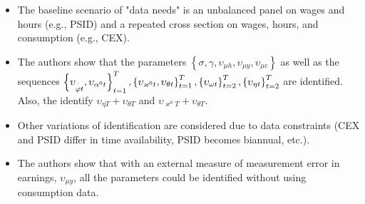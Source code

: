 \documentclass[notes=show]{beamer}
\begin{document}
\bigskip

\begin{frame}%



\begin{itemize}
\item The baseline scenario of "data needs" is an unbalanced panel on wages
and hours (e.g., PSID) and a repeated cross section on wages, hours, and
consumption (e.g., CEX).

\item The authors show that the parameters $\left\{ \sigma ,\gamma ,\upsilon
_{\mu h},\upsilon _{\mu y},\upsilon _{\mu c}\right\} $ as well as the
sequences $\left\{ \upsilon _{\overset{\symbol{94}}{\varphi }t},\upsilon
_{\alpha ^{0}t}\right\} _{t=1}^{T},\left\{ \upsilon _{\varkappa
^{0}t},\upsilon _{\theta t}\right\} _{t=1}^{T},\left\{ \upsilon _{\omega
t}\right\} _{t=2}^{T},\left\{ \upsilon _{\eta t}\right\} _{t=2}^{T}$ are
identified. Also, the identify $\upsilon _{\eta T}+\upsilon _{\theta T}$ and 
$\upsilon _{\varkappa ^{0}T}+\upsilon _{\theta T}$.

\item Other variations of identification are considered due to data
constraints (CEX and PSID differ in time availability, PSID becomes
biannual, etc.).

\item The authors show that with an external measure of measurement error in
earnings, $\upsilon _{\mu y}$, all the parameters could be identified
without using consumption data.
\end{itemize}

\transboxout%
\end{frame}%

\bigskip
\end{document}
